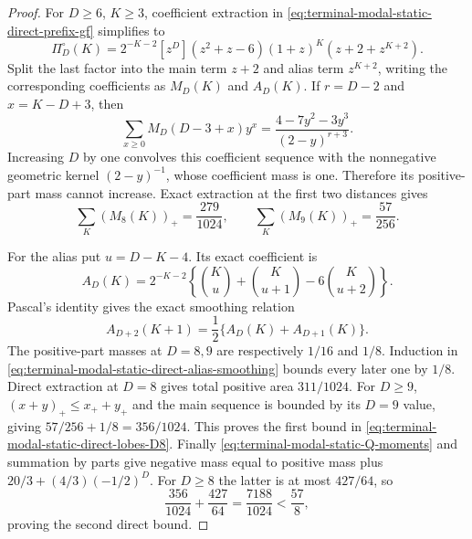 \begin{proof}
For $D\ge6$, $K\ge3$, coefficient extraction in
\eqref{eq:terminal-modal-static-direct-prefix-gf} simplifies to
\begin{equation}
 \Pi_D^\circ(K)=2^{-K-2}[z^D](z^2+z-6)(1+z)^K
 (z+2+z^{K+2}).
 \label{eq:terminal-modal-static-direct-prefix-simple}
\end{equation}
Split the last factor into the main term $z+2$ and alias term $z^{K+2}$,
writing the corresponding coefficients as $M_D(K)$ and $A_D(K)$.  If
$r=D-2$ and $x=K-D+3$, then
\begin{equation}
 \sum_{x\ge0}M_D(D-3+x)y^x
 =\frac{4-7y^2-3y^3}{(2-y)^{r+3}}.
 \label{eq:terminal-modal-static-direct-main-gf}
\end{equation}
Increasing $D$ by one convolves this coefficient sequence with the
nonnegative geometric kernel $(2-y)^{-1}$, whose coefficient mass is one.
Therefore its positive-part mass cannot increase.  Exact extraction at the
first two distances gives
\begin{equation}
 \sum_K(M_8(K))_+=\frac{279}{1024},
 \qquad
 \sum_K(M_9(K))_+=\frac{57}{256}.
 \label{eq:terminal-modal-static-direct-main-base}
\end{equation}

For the alias put $u=D-K-4$.  Its exact coefficient is
\begin{equation}
 A_D(K)=2^{-K-2}\left\{
 \binom Ku+\binom K{u+1}-6\binom K{u+2}\right\}.
 \label{eq:terminal-modal-static-direct-alias}
\end{equation}
Pascal's identity gives the exact smoothing relation
\begin{equation}
 A_{D+2}(K+1)=\frac12\{A_D(K)+A_{D+1}(K)\}.
 \label{eq:terminal-modal-static-direct-alias-smoothing}
\end{equation}
The positive-part masses at $D=8,9$ are respectively $1/16$ and $1/8$.
Induction in \eqref{eq:terminal-modal-static-direct-alias-smoothing} bounds
every later one by $1/8$.  Direct extraction at $D=8$ gives total positive
area $311/1024$.  For $D\ge9$, $(x+y)_+\le x_++y_+$ and the main sequence is
bounded by its $D=9$ value, giving
$57/256+1/8=356/1024$.  This proves the first bound in
\eqref{eq:terminal-modal-static-direct-lobes-D8}.  Finally
\eqref{eq:terminal-modal-static-Q-moments} and summation by parts give
negative mass equal to positive mass plus
$20/3+(4/3)(-1/2)^D$.  For $D\ge8$ the latter is at most $427/64$, so
\[
 \frac{356}{1024}+\frac{427}{64}
 =\frac{7188}{1024}<\frac{57}{8},
\]
proving the second direct bound.
\end{proof}

